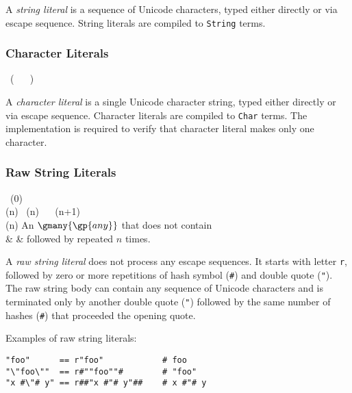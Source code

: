 A \emph{string literal} is a sequence of Unicode characters, typed either directly or via escape sequence. String literals are compiled to \lstinline{String} terms.

\subsubsection*{Character Literals}

\begin{bnf}
   \eq {} \ ( \  \gor {} \ ) \ 
\end{bnf}

A \emph{character literal} is a single Unicode character string, typed either directly or via escape sequence. Character literals are compiled to \lstinline{Char} terms. The implementation is required to verify that character literal makes only one character.

\subsubsection*{Raw String Literals}

\begin{bnf}
        \eq {} \ (0) \\
  (n)  \eq    {} \ (n) \ 
                      \gorln \term{\#} \ (n+1) \ \term{\#} \\
  (n) \eq \textnormal{An \(\gmany{\gp{any}}\) that does not contain} \\
                      & & \textnormal{ followed by \term{\#} repeated \(n\) times.}
\end{bnf}

A \emph{raw string literal} does not process any escape sequences. It starts with letter \texttt{r}, followed by zero or more repetitions of hash symbol (\texttt{\#}) and double quote (\texttt{"}). The raw string body can contain any sequence of Unicode characters and is terminated only by another double quote (\texttt{"}) followed by the same number of hashes (\texttt{\#}) that proceeded the opening quote.

Examples of raw string literals:

\begin{lstlisting}
"foo"      == r"foo"            # foo
"\"foo\""  == r#""foo""#        # "foo"
"x #\"# y" == r##"x #"# y"##    # x #"# y
\end{lstlisting}

